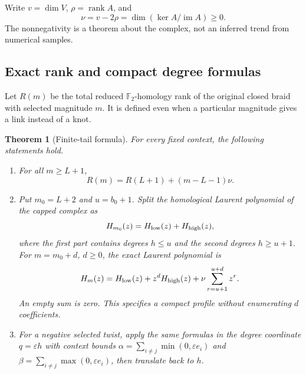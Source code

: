 \documentclass[11pt]{article}
\newtheorem{theorem}{Theorem}[section]
\theoremstyle{definition}
\theoremstyle{remark}
\newcommand{\F}{\mathbb F_2}
\newcommand{\rank}{\operatorname{rank}}
\newcommand{\im}{\operatorname{im}}
\begin{document}
Write $v=\dim V$, $\rho=\rank A$, and
\begin{equation}
 \nu=v-2\rho=\dim(\ker A/\im A)\ge0.
 \label{eq:nu}
\end{equation}
The nonnegativity is a theorem about the complex, not an inferred trend from numerical samples.

\subsection{Exact rank and compact degree formulas}
Let $R(m)$ be the total reduced $\F$-homology rank of the original closed braid with selected magnitude $m$. It is defined even when a particular magnitude gives a link instead of a knot.

\begin{theorem}[Finite-tail formula]
\label{thm:tail}
For every fixed context, the following statements hold.
\begin{enumerate}
\item For all $m\ge L+1$,
\begin{equation}
 R(m)=R(L+1)+(m-L-1)\nu.
 \label{eq:affine}
\end{equation}
\item Put $m_0=L+2$ and $u=b_0+1$. Split the homological Laurent polynomial of the capped complex as
\[
 H_{m_0}(z)=H_{\rm low}(z)+H_{\rm high}(z),
\]
where the first part contains degrees $h\le u$ and the second degrees $h\ge u+1$. For $m=m_0+d$, $d\ge0$, the exact Laurent polynomial is
\begin{equation}
 H_m(z)=H_{\rm low}(z)+z^dH_{\rm high}(z)
             +\nu\sum_{r=u+1}^{u+d}z^r.
 \label{eq:profile}
\end{equation}
An empty sum is zero. This specifies a compact profile without enumerating $d$ coefficients.
\item For a negative selected twist, apply the same formulas in the degree coordinate $q=\varepsilon h$ with context bounds
$\alpha=\sum_{i\ne j}\min(0,\varepsilon e_i)$ and
$\beta=\sum_{i\ne j}\max(0,\varepsilon e_i)$, then translate back to $h$.
\end{enumerate}
\end{theorem}
\end{document}
